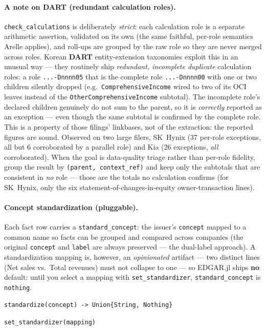 \documentclass[11pt,a4paper]{report}
\newcommand{\sig}[1]{\medskip\noindent\texttt{#1}\par\medskip}
\begin{document}
\paragraph{A note on DART (redundant calculation roles).} \texttt{check\_calculations} is deliberately
\emph{strict}: each calculation role is a separate arithmetic assertion, validated on its own (the same
faithful, per-role semantics Arelle applies), and roll-ups are grouped by the raw role so they are never
merged across roles. Korean \textbf{DART} entity-extension taxonomies exploit this in an unusual way ---
they routinely ship \emph{redundant, incomplete duplicate} calculation roles: a role \texttt{...-Dnnnn05}
that is the complete role \texttt{...-Dnnnn00} with one or two children silently dropped (e.g.\
\texttt{ComprehensiveIncome} wired to two of its OCI leaves instead of the \texttt{OtherComprehensiveIncome}
subtotal). The incomplete role's declared children genuinely do not sum to the parent, so it is
\emph{correctly} reported as an exception --- even though the same subtotal is confirmed by the complete
role. This is a property of those filings' linkbases, not of the extraction: the reported figures are
sound. Observed on two large filers, SK~Hynix (37 per-role exceptions, all but 6 corroborated by a parallel
role) and Kia (26 exceptions, \emph{all} corroborated). When the goal is data-quality triage rather than
per-role fidelity, group the result by \texttt{(parent, context\_ref)} and keep only the subtotals that are
consistent in \emph{no} role --- those are the totals no calculation confirms (for SK~Hynix, only the six
statement-of-changes-in-equity owner-transaction lines).

\paragraph{Concept standardization (pluggable).} Each fact row carries a
\texttt{standard\_concept}: the issuer's \texttt{concept} mapped to a common name so facts can be
grouped and compared across companies (the original \texttt{concept} and \texttt{label} are
always preserved --- the dual-label approach). A standardization mapping is, however, an
\emph{opinionated} artifact --- two distinct lines (Net sales vs.\ Total revenues) must not
collapse to one --- so EDGAR.jl ships \textbf{no} default: until you select a mapping with
\texttt{set\_standardizer}, \texttt{standard\_concept} is \texttt{nothing}.

\sig{standardize(concept) -> Union\{String, Nothing\}}
\sig{set\_standardizer(mapping)}
\end{document}
